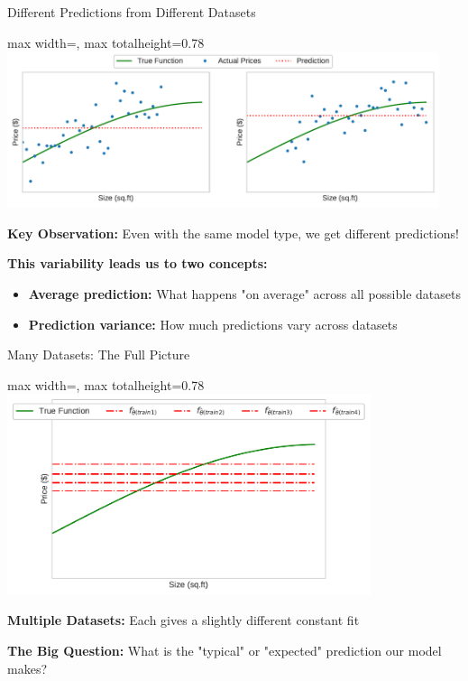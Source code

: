 \documentclass[10pt]{beamer}
\newcommand{\fitpic}[1]{\begin{adjustbox}{max width=\linewidth, max totalheight=0.78\textheight}#1\end{adjustbox}}
\begin{document}
\begin{frame}{Different Predictions from Different Datasets}
\begin{center}
\fitpic{\includegraphics[width=0.95\textwidth]{../assets/bias-variance/figures/bias3.pdf}}
\end{center}

\begin{alertbox}
\textbf{Key Observation:} Even with the same model type, we get different predictions!
\end{alertbox}

\begin{definitionbox}
\textbf{This variability leads us to two concepts:}
\begin{itemize}
\item \textbf{Average prediction:} What happens "on average" across all possible datasets
\item \textbf{Prediction variance:} How much predictions vary across datasets
\end{itemize}
\end{definitionbox}
\end{frame}

\begin{frame}{Many Datasets: The Full Picture}
\begin{center}
\fitpic{\includegraphics[width=0.8\textwidth]{../assets/bias-variance/figures/bias4.pdf}}
\end{center}

\begin{keypointsbox}
\textbf{Multiple Datasets:} Each gives a slightly different constant fit
\end{keypointsbox}

\begin{examplebox}
\textbf{The Big Question:} What is the "typical" or "expected" prediction our model makes?
\end{examplebox}
\end{frame}
\end{document}
